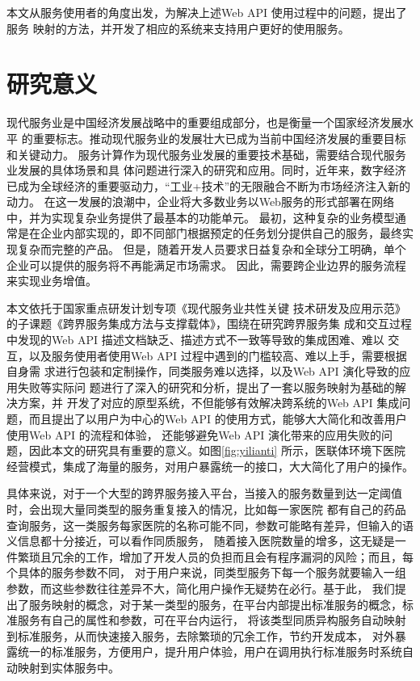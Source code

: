 本文从服务使用者的角度出发，为解决上述Web API 使用过程中的问题，提出了服务
映射的方法，并开发了相应的系统来支持用户更好的使用服务。

\section{研究意义}
现代服务业是中国经济发展战略中的重要组成部分，也是衡量一个国家经济发展水平
的重要标志。推动现代服务业的发展壮大已成为当前中国经济发展的重要目标和关键动力。
服务计算作为现代服务业发展的重要技术基础，需要结合现代服务业发展的具体场景和具
体问题进行深入的研究和应用。同时，近年来，数字经济已成为全球经济的重要驱动力，“工业+技术”的无限融合不断为市场经济注入新的动力。
在这一发展的浪潮中，企业将大多数业务以Web服务的形式部署在网络中，并为实现复杂业务提供了最基本的功能单元。
最初，这种复杂的业务模型通常是在企业内部实现的，即不同部门根据预定的任务划分提供自己的服务，最终实现复杂而完整的产品。 
但是，随着开发人员要求日益复杂和全球分工明确，单个企业可以提供的服务将不再能满足市场需求。 因此，需要跨企业边界的服务流程来实现业务增值。

本文依托于国家重点研发计划专项《现代服务业共性关键
技术研发及应用示范》的子课题《跨界服务集成方法与支撑载体》，围绕在研究跨界服务集
成和交互过程中发现的Web API 描述文档缺乏、描述方式不一致等导致的集成困难、难以
交互，以及服务使用者使用Web API 过程中遇到的门槛较高、难以上手，需要根据自身需
求进行包装和定制操作，同类服务难以选择，以及Web API 演化导致的应用失败等实际问
题进行了深入的研究和分析，提出了一套以服务映射为基础的解决方案，并
开发了对应的原型系统，不但能够有效解决跨系统的Web API 集成问题，而且提出了以用户为中心的Web API 的使用方式，能够大大简化和改善用户使用Web API 的流程和体验，
还能够避免Web API 演化带来的应用失败的问题，因此本文的研究具有重要的意义。如图\ref{fig:yilianti}
所示，医联体环境下医院经营模式，集成了海量的服务，对用户暴露统一的接口，大大简化了用户的操作。



具体来说，对于一个大型的跨界服务接入平台，当接入的服务数量到达一定阈值时，会出现大量同类型的服务重复接入的情况，比如每一家医院
都有自己的药品查询服务，这一类服务每家医院的名称可能不同，参数可能略有差异，但输入的语义信息都十分接近，可以看作同质服务，
随着接入医院数量的增多，这无疑是一件繁琐且冗余的工作，增加了开发人员的负担而且会有程序漏洞的风险；而且，每个具体的服务参数不同，
对于用户来说，同类型服务下每一个服务就要输入一组参数，而这些参数往往差异不大，简化用户操作无疑势在必行。基于此，
我们提出了服务映射的概念，对于某一类型的服务，在平台内部提出标准服务的概念，标准服务有自己的属性和参数，可在平台内运行，
将该类型同质异构服务自动映射到标准服务，从而快速接入服务，去除繁琐的冗余工作，节约开发成本，
对外暴露统一的标准服务，方便用户，提升用户体验，用户在调用执行标准服务时系统自动映射到实体服务中。

